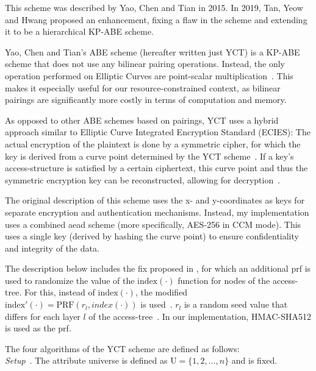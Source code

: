 This scheme was described by Yao, Chen and Tian \cite{yao_lightweight_2015} in 2015.
In 2019, Tan, Yeow and Hwang \cite{tan_enhancement_2019} proposed an enhancement, fixing a flaw in the scheme and extending it to be a hierarchical KP-ABE scheme.

Yao, Chen and Tian's ABE scheme (hereafter written just YCT) is a KP-ABE scheme that does not use any bilinear pairing operations.
Instead, the only operation performed on Elliptic Curves are point-scalar multiplication~\cite{yao_lightweight_2015}.
This makes it especially useful for our resource-constrained context, as bilinear pairings are significantly more costly in terms of computation and memory.

As opposed to other ABE schemes based on pairings, YCT uses a hybrid approach similar to Elliptic Curve Integrated Encryption Standard (ECIES):
The actual encryption of the plaintext is done by a symmetric cipher, for which the key is derived from a curve point determined by the YCT scheme~\cite{yao_lightweight_2015}.
If a key's \gls{access-structure} is satisfied by a certain ciphertext, this curve point and thus the symmetric encryption key can be reconstructed, allowing for decryption~\cite{yao_lightweight_2015}.

The original description of this scheme uses the x- and y-coordinates as keys for separate encryption and authentication mechanisms.
Instead, my implementation uses a combined \acrshort{aead} scheme (more specifically, AES-256 in CCM mode).
This uses a single key (derived by hashing the curve point) to ensure confidentiality and integrity of the data.

The description below includes the fix proposed in \cite{tan_enhancement_2019}, for which an additional \acrshort{prf} is used to randomize the value of the $\text{index}(\cdot)$ function for nodes of the \gls{access-tree}.
For this, instead of $\text{index}(\cdot)$, the modified $\text{index}'(\cdot) = \text{PRF}(r_l, index(\cdot))$ is used~\cite{tan_enhancement_2019}.
$r_l$ is a random seed value that differs for each layer $l$ of the \gls{access-tree}~\cite{tan_enhancement_2019}.
In our implementation, HMAC-SHA512 is used as the \acrshort{prf}.

The four algorithms of the YCT scheme are defined as follows: \\

\emph{Setup}~\cite{yao_lightweight_2015}.
The attribute universe is defined as $\text{U} = \{1, 2, \dots, n\}$ and is fixed.

